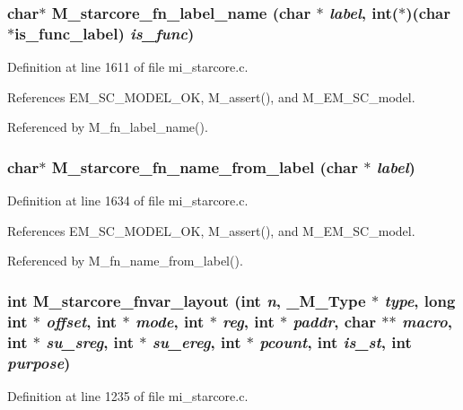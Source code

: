 \subsubsection{\setlength{\rightskip}{0pt plus 5cm}char$\ast$ M\_\-starcore\_\-fn\_\-label\_\-name (char $\ast$ {\em label}, int($\ast$)(char $\ast$is\_\-func\_\-label) {\em is\_\-func})}\label{mi__starcore_8c_a1277d6e6bef03a3c24b733a0ee2340d}




Definition at line 1611 of file mi\_\-starcore.c.

References EM\_\-SC\_\-MODEL\_\-OK, M\_\-assert(), and M\_\-EM\_\-SC\_\-model.

Referenced by M\_\-fn\_\-label\_\-name().
\subsubsection{\setlength{\rightskip}{0pt plus 5cm}char$\ast$ M\_\-starcore\_\-fn\_\-name\_\-from\_\-label (char $\ast$ {\em label})}\label{mi__starcore_8c_818e1e776e411a1471bd0e340b85185c}




Definition at line 1634 of file mi\_\-starcore.c.

References EM\_\-SC\_\-MODEL\_\-OK, M\_\-assert(), and M\_\-EM\_\-SC\_\-model.

Referenced by M\_\-fn\_\-name\_\-from\_\-label().
\subsubsection{\setlength{\rightskip}{0pt plus 5cm}int M\_\-starcore\_\-fnvar\_\-layout (int {\em n}, \bf{\_\-M\_\-Type} $\ast$ {\em type}, long int $\ast$ {\em offset}, int $\ast$ {\em mode}, int $\ast$ {\em reg}, int $\ast$ {\em paddr}, char $\ast$$\ast$ {\em macro}, int $\ast$ {\em su\_\-sreg}, int $\ast$ {\em su\_\-ereg}, int $\ast$ {\em pcount}, int {\em is\_\-st}, int {\em purpose})}\label{mi__starcore_8c_d5dd9b979ffac4638971c7f736d3a4bb}




Definition at line 1235 of file mi\_\-starcore.c.

